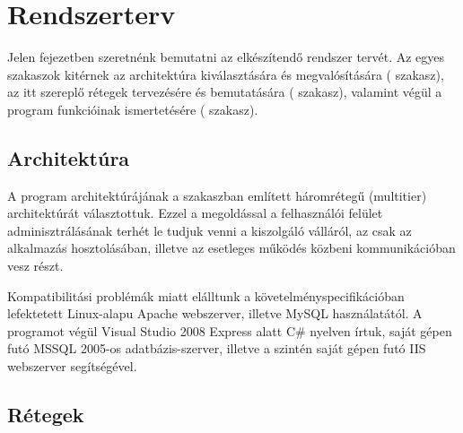 \chapter{Rendszerterv}\label{sect:rszterv}

Jelen fejezetben szeretnénk bemutatni az elkészítendő rendszer tervét. Az egyes szakaszok kitérnek az architektúra kiválasztására és megvalósítására ( szakasz), az itt szereplő rétegek tervezésére és bemutatására ( szakasz), valamint végül a program funkcióinak ismertetésére ( szakasz).

\section{Architektúra}\label{sect:architektura}

A program architektúrájának a  szakaszban említett háromrétegű (multitier) architektúrát választottuk. Ezzel a megoldással a felhasználói felület adminisztrálásának terhét le tudjuk venni a kiszolgáló válláról, az csak az alkalmazás hosztolásában, illetve az esetleges működés közbeni kommunikációban vesz részt.

\bigskip

Kompatibilitási problémák miatt elálltunk a követelményspecifikációban lefektetett Linux-alapu Apache webszerver, illetve MySQL használatától. A programot végül Visual Studio 2008 Express alatt C\# nyelven írtuk, saját gépen futó MSSQL 2005-os adatbázis-szerver, illetve a szintén saját gépen futó IIS webszerver segítségével.


\section{Rétegek}\label{sect:retegek}

